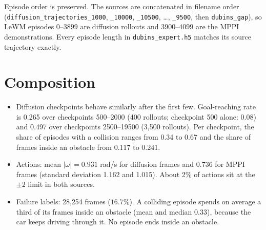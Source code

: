 \documentclass[11pt]{article}
\newcommand{\file}[1]{\nolinkurl{#1}}
\begin{document}
Episode order is preserved. The sources are concatenated in filename order (\file{diffusion_trajectories_1000}, \file{_10000}, \file{_10500}, \dots, \file{_9500}, then \file{dubins_gap}), so LeWM episodes $0$--$3899$ are diffusion rollouts and $3900$--$4099$ are the MPPI demonstrations. Every episode length in \file{dubins_expert.h5} matches its source trajectory exactly.

\section{Composition}

\begin{table}[h]
\centering
{}
\caption{Composition of \file{dubins_expert.h5}. ``Goal reached'' is the source file's per-trajectory \file{success} flag.}
\end{table}

\begin{itemize}
\item Diffusion checkpoints behave similarly after the first few. Goal-reaching rate is 0.265 over checkpoints 500--2000 (400 rollouts; checkpoint 500 alone: 0.08) and 0.497 over checkpoints 2500--19500 (3{,}500 rollouts). Per checkpoint, the share of episodes with a collision ranges from 0.34 to 0.67 and the share of frames inside an obstacle from 0.117 to 0.241.
\item Actions: mean $|\omega| = 0.931$ rad/s for diffusion frames and $0.736$ for MPPI frames (standard deviation 1.162 and 1.015). About 2\% of actions sit at the $\pm 2$ limit in both sources.
\item Failure labels: 28{,}254 frames ($16.7\%$). A colliding episode spends on average a third of its frames inside an obstacle (mean and median 0.33), because the car keeps driving through it. No episode ends inside an obstacle.
\end{itemize}
\end{document}
